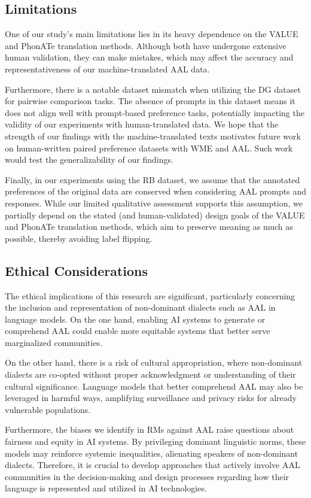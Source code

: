 \subsection{Limitations}
One of our study's main limitations lies in its heavy dependence on the VALUE \cite{ziems_value_2022} and PhonATe \cite{deas2024phonate} translation methods. Although both have undergone extensive human validation, they can make mistakes, which may affect the accuracy and representativeness of our machine-translated AAL data.

Furthermore, there is a notable dataset mismatch when utilizing the \textsc{DG} dataset for pairwise comparison tasks. The absence of prompts in this dataset means it does not align well with prompt-based preference tasks, potentially impacting the validity of our experiments with human-translated data. We hope that the strength of our findings with the machine-translated texts motivates future work on human-written paired preference datasets with WME and AAL. Such work would test the generalizability of our findings. 

Finally, in our experiments using the \textsc{RB} dataset, we assume that the annotated preferences of the original data are conserved when considering AAL prompts and responses. While our limited qualitative assessment supports this assumption, we partially depend on the stated (and human-validated) design goals of the VALUE and PhonATe translation methods, which aim to preserve meaning as much as possible, thereby avoiding label flipping.

\subsection{Ethical Considerations}
The ethical implications of this research are significant, particularly concerning the inclusion and representation of non-dominant dialects such as AAL in language models. On the one hand, enabling AI systems to generate or comprehend AAL could enable more equitable systems that better serve marginalized communities.

On the other hand, there is a risk of cultural appropriation, where non-dominant dialects are co-opted without proper acknowledgment or understanding of their cultural significance. Language models that better comprehend AAL may also be leveraged in harmful ways, amplifying surveillance and privacy risks for already vulnerable populations.

Furthermore, the biases we identify in RMs against AAL raise questions about fairness and equity in AI systems. By privileging dominant linguistic norms, these models may reinforce systemic inequalities, alienating speakers of non-dominant dialects. Therefore, it is crucial to develop approaches that actively involve AAL communities in the decision-making and design processes regarding how their language is represented and utilized in AI technologies.

